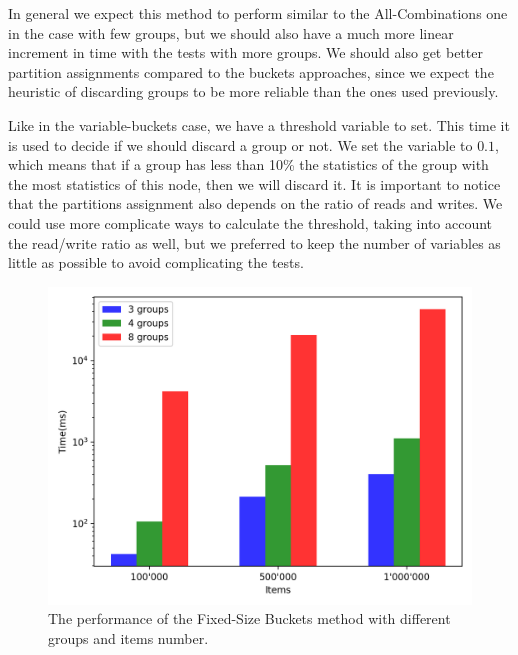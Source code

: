 In general we expect this method to perform similar to the All-Combinations one in the case with few groups, but we should also have a much more linear increment in time with the tests with more groups. We should also get better partition assignments compared to the buckets approaches, since we expect the heuristic of discarding groups to be more reliable than the ones used previously.

Like in the variable-buckets case, we have a threshold variable to set. This time it is used to decide if we should discard a group or not. We set the variable to $0.1$, which means that if a group has less than 10\% the statistics of the group with the most statistics of this node, then we will discard it. It is important to notice that the partitions assignment also depends on the ratio of reads and writes. We could use more complicate ways to calculate the threshold, taking into account the read/write ratio as well, but we preferred to keep the number of variables as little as possible to avoid complicating the tests.

\begin{figure}[!htb]
  \centering
  \includegraphics[width=\textwidth,height=\textheight,keepaspectratio]{img/hot.png}
  \caption{The performance of the Fixed-Size Buckets method with different groups and items number.}
  \label{fig:hot}
\end{figure}

